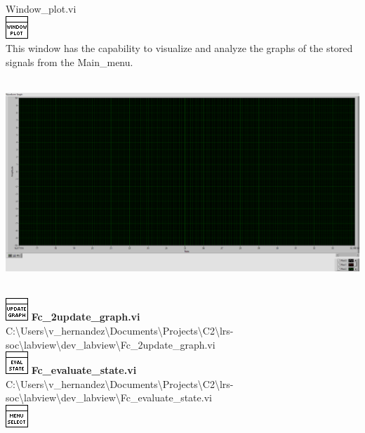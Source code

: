 \documentclass[
]{article}
\begin{document}
\hfill\break
Window\_plot.vi\\
\includegraphics{LVtemp20240312184738_0_0c.png}\\
This window has the capability to visualize and analyze the graphs of
the stored signals from the Main\_menu.\\
\strut \\
\includegraphics{LVtemp20240312184738_1_0.png}\\
\strut \\
\includegraphics{Fc_2update_graph_viLVtemp20240312184738_2_0.png}
\textbf{Fc\_2update\_graph.vi\\
}
C:\textbackslash Users\textbackslash v\_hernandez\textbackslash Documents\textbackslash Projects\textbackslash C2\textbackslash lrs-soc\textbackslash labview\textbackslash dev\_labview\textbackslash Fc\_2update\_graph.vi\\
\includegraphics{Fc_evaluate_state_viLVtemp20240312184738_3_0.png}
\textbf{Fc\_evaluate\_state.vi\\
}
C:\textbackslash Users\textbackslash v\_hernandez\textbackslash Documents\textbackslash Projects\textbackslash C2\textbackslash lrs-soc\textbackslash labview\textbackslash dev\_labview\textbackslash Fc\_evaluate\_state.vi\\
\includegraphics{Fc_MenuSelections_viLVtemp20240312184738_4_0.png}
\end{document}
